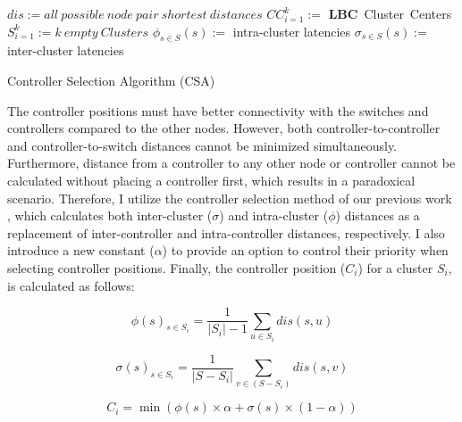 \documentclass{IEEEtran}
\begin{document}
	
	\begin{algorithm}
		\SetAlgoLined
		$dis := all~possible~node~pair~shortest~distances$\;
		$CC_{i=1}^k :=$ \textbf{LBC}~Cluster~Centers\;
		$S_{i=1}^k := k~empty~Clusters$\;
		$\phi_{s\in S}(s) :=$ intra-cluster latencies\;
		$\sigma_{s\in S}(s) :=$ inter-cluster latencies\;
		\caption{Controller Selection Algorithm (CSA)} \label{algo:csa}
	\end{algorithm}
	
	The controller positions must have better connectivity with the switches and controllers compared to the other nodes. However, both controller-to-controller and controller-to-switch distances cannot be minimized simultaneously. Furthermore, distance from a controller to any other node or controller cannot be calculated without placing a controller first, which results in a paradoxical scenario. Therefore, I utilize the controller selection method of our previous work \cite{aziz2019degree}, which calculates both inter-cluster ($\sigma$) and intra-cluster ($\phi$) distances as a replacement of inter-controller and intra-controller distances, respectively. I also introduce a new constant ($\alpha$) to provide an option to control their priority when selecting controller positions. Finally, the controller position ($C_i$) for a cluster $S_i$, is calculated as follows:
	
	\begin{equation} \label{eqn:intra}
		\phi(s)_{s\in S_i} = \frac{1}{|S_i|-1}\sum_{u\in S_i} dis(s,u)
	\end{equation}
	
	\begin{equation} \label{eqn:inter}
		\sigma(s)_{s\in S_i} = \frac{1}{|S-S_i|}\sum_{v\in (S-S_i)} dis(s,v)
	\end{equation}
	
	\begin{equation} \label{eqn:totlat}
		C_i = \min(\phi(s)\times \alpha + \sigma(s)\times(1-\alpha))
	\end{equation}
	
\end{document}
